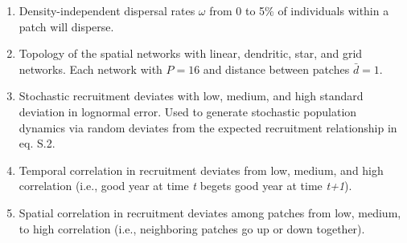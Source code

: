 \documentclass[
]{article}
\providecommand{\tightlist}{%
  \setlength{\itemsep}{0pt}\setlength{\parskip}{0pt}}
\begin{document}
\begin{enumerate}
\begin{enumerate}
\begin{enumerate}
      \begin{itemize}
      \tightlist
      \item
        a total loss that summed to a \textasciitilde90\% loss in
        abundance to the whole metapopulation, and
      \item
        left at least one local patch \emph{undisturbed} to start
        metapopulation recoveries.
      \end{itemize}
    \end{enumerate}
  \end{enumerate}
\item
  Density-independent dispersal rates \(\omega\) from 0 to 5\% of
  individuals within a patch will disperse.
\item
  Topology of the spatial networks with linear, dendritic, star, and
  grid networks. Each network with \(P=16\) and distance between patches
  \(\bar{d}=1\).
\item
  Stochastic recruitment deviates with low, medium, and high standard
  deviation in lognormal error. Used to generate stochastic population
  dynamics via random deviates from the expected recruitment
  relationship in eq. S.2.
\item
  Temporal correlation in recruitment deviates from low, medium, and
  high correlation (i.e., good year at time \emph{t} begets good year at
  time \emph{t+1}).
\item
  Spatial correlation in recruitment deviates among patches from low,
  medium, to high correlation (i.e., neighboring patches go up or down
  together).
\end{enumerate}
\end{document}
